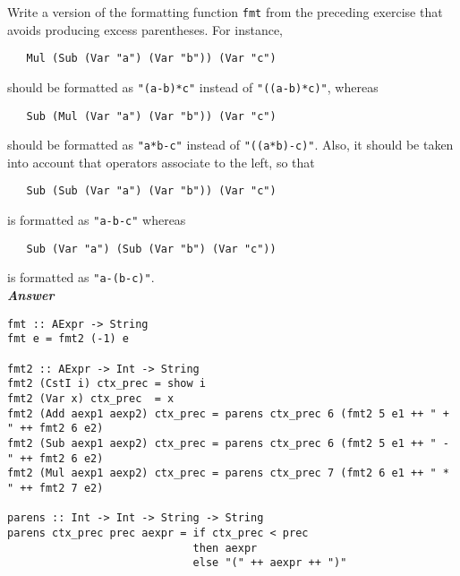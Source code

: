 \documentclass[a4paper]{article}
\begin{document}
\begin{exercise}\label{exer-better-fmt}
  Write a version of the formatting function \texttt{fmt} from the
preceding exercise that avoids producing excess parentheses.  For
instance,

{\codesetup\begin{verbatim}
   Mul (Sub (Var "a") (Var "b")) (Var "c")
\end{verbatim}}

\noindent    
should be formatted as \texttt{"(a-b)*c"} instead of
\texttt{"((a-b)*c)"}, whereas

{\codesetup\begin{verbatim}
   Sub (Mul (Var "a") (Var "b")) (Var "c")
\end{verbatim}}
    
\noindent    
should be formatted as \texttt{"a*b-c"} instead of
\texttt{"((a*b)-c)"}.  Also, it should be taken into account that
operators associate to the left, so that

{\codesetup\begin{verbatim}
   Sub (Sub (Var "a") (Var "b")) (Var "c") 
\end{verbatim}}

\noindent    
is formatted as \texttt{"a-b-c"} whereas

{\codesetup\begin{verbatim}
   Sub (Var "a") (Sub (Var "b") (Var "c"))
\end{verbatim}}

\noindent    
is formatted as \texttt{"a-(b-c)"}.\\
     
\noindent
\textbf{\emph{Answer}}
{\codesetup\begin{verbatim}
fmt :: AExpr -> String
fmt e = fmt2 (-1) e

fmt2 :: AExpr -> Int -> String
fmt2 (CstI i) ctx_prec = show i
fmt2 (Var x) ctx_prec  = x
fmt2 (Add aexp1 aexp2) ctx_prec = parens ctx_prec 6 (fmt2 5 e1 ++ " + " ++ fmt2 6 e2)
fmt2 (Sub aexp1 aexp2) ctx_prec = parens ctx_prec 6 (fmt2 5 e1 ++ " - " ++ fmt2 6 e2) 
fmt2 (Mul aexp1 aexp2) ctx_prec = parens ctx_prec 7 (fmt2 6 e1 ++ " * " ++ fmt2 7 e2)

parens :: Int -> Int -> String -> String
parens ctx_prec prec aexpr = if ctx_prec < prec 
                             then aexpr 
                             else "(" ++ aexpr ++ ")"
\end{verbatim}}

\end{exercise}
\end{document}
